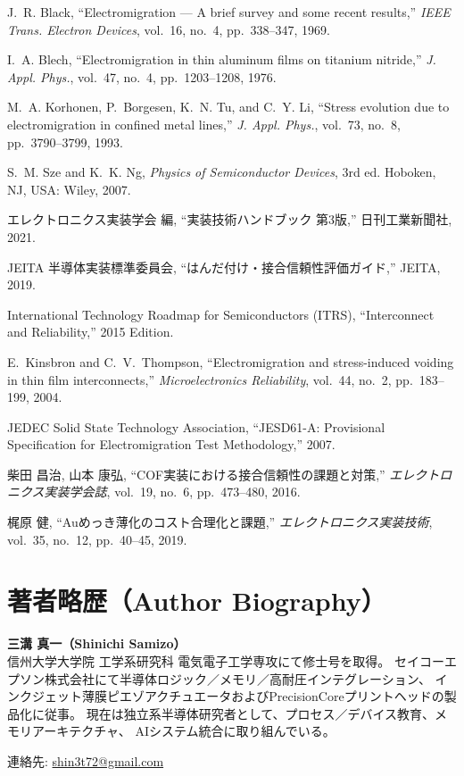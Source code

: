 \documentclass[conference]{IEEEtran}
\begin{document}
\balance

\begin{thebibliography}{99}

J.~R. Black, ``Electromigration --- A brief survey and some recent results,''
\emph{IEEE Trans. Electron Devices}, vol.~16, no.~4, pp.~338--347, 1969.

I.~A. Blech, ``Electromigration in thin aluminum films on titanium nitride,''
\emph{J. Appl. Phys.}, vol.~47, no.~4, pp.~1203--1208, 1976.

M.~A. Korhonen, P.~Borgesen, K.~N. Tu, and C.~Y. Li,
``Stress evolution due to electromigration in confined metal lines,''
\emph{J. Appl. Phys.}, vol.~73, no.~8, pp.~3790--3799, 1993.

S.~M. Sze and K.~K. Ng, \emph{Physics of Semiconductor Devices}, 3rd ed.
Hoboken, NJ, USA: Wiley, 2007.

エレクトロニクス実装学会 編, 
``実装技術ハンドブック 第3版,'' 日刊工業新聞社, 2021.

JEITA 半導体実装標準委員会, 
``はんだ付け・接合信頼性評価ガイド,'' JEITA, 2019.

International Technology Roadmap for Semiconductors (ITRS), 
``Interconnect and Reliability,'' 2015 Edition.

E.~Kinsbron and C.~V.~Thompson, 
``Electromigration and stress-induced voiding in thin film interconnects,''
\emph{Microelectronics Reliability}, vol.~44, no.~2, pp.~183--199, 2004.

JEDEC Solid State Technology Association, 
``JESD61-A: Provisional Specification for Electromigration Test Methodology,'' 2007.

柴田 昌治, 山本 康弘, 
``COF実装における接合信頼性の課題と対策,''
\emph{エレクトロニクス実装学会誌}, vol.~19, no.~6, pp.~473--480, 2016.

梶原 健, ``Auめっき薄化のコスト合理化と課題,'' 
\emph{エレクトロニクス実装技術}, vol.~35, no.~12, pp.~40--45, 2019.

\end{thebibliography}

\section*{著者略歴（Author Biography）}
\textbf{三溝 真一（Shinichi Samizo）} \\
信州大学大学院 工学系研究科 電気電子工学専攻にて修士号を取得。  
セイコーエプソン株式会社にて半導体ロジック／メモリ／高耐圧インテグレーション、  
インクジェット薄膜ピエゾアクチュエータおよびPrecisionCoreプリントヘッドの製品化に従事。  
現在は独立系半導体研究者として、プロセス／デバイス教育、メモリアーキテクチャ、  
AIシステム統合に取り組んでいる。  

連絡先: \href{mailto:shin3t72@gmail.com}{shin3t72@gmail.com}
\end{document}
